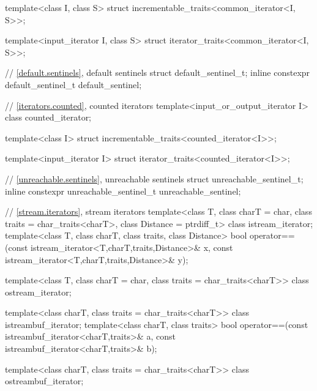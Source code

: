 \begin{codeblock}
{  template<class I, class S>
    struct incrementable_traits<common_iterator<I, S>>;

  template<input_iterator I, class S>
    struct iterator_traits<common_iterator<I, S>>;

  // \ref{default.sentinels}, default sentinels
  struct default_sentinel_t;
  inline constexpr default_sentinel_t default_sentinel{};

  // \ref{iterators.counted}, counted iterators
  template<input_or_output_iterator I> class counted_iterator;

  template<class I>
    struct incrementable_traits<counted_iterator<I>>;

  template<input_iterator I>
    struct iterator_traits<counted_iterator<I>>;

  // \ref{unreachable.sentinels}, unreachable sentinels
  struct unreachable_sentinel_t;
  inline constexpr unreachable_sentinel_t unreachable_sentinel{};

  // \ref{stream.iterators}, stream iterators
  template<class T, class charT = char, class traits = char_traits<charT>,
           class Distance = ptrdiff_t>
  class istream_iterator;
  template<class T, class charT, class traits, class Distance>
    bool operator==(const istream_iterator<T,charT,traits,Distance>& x,
            const istream_iterator<T,charT,traits,Distance>& y);

  template<class T, class charT = char, class traits = char_traits<charT>>
      class ostream_iterator;

  template<class charT, class traits = char_traits<charT>>
    class istreambuf_iterator;
  template<class charT, class traits>
    bool operator==(const istreambuf_iterator<charT,traits>& a,
            const istreambuf_iterator<charT,traits>& b);

  template<class charT, class traits = char_traits<charT>>
    class ostreambuf_iterator;

}
\end{codeblock}
